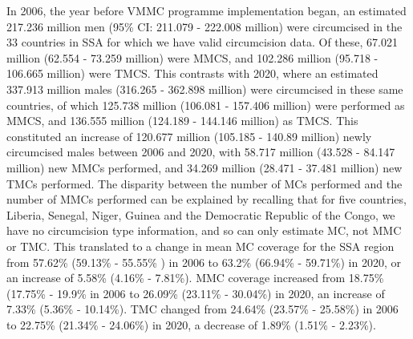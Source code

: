 \documentclass{article}
\begin{document}
In 2006, the year before VMMC programme implementation began, an estimated 217.236 million men (95\%
CI: 211.079 - 222.008 million) were circumcised in the 33 countries in SSA for which we have valid circumcision
data. 
Of these, 67.021 million (62.554 - 73.259 million) were MMCS, and 102.286 million (95.718 - 106.665
million) were TMCS. 
This contrasts with 2020, where an estimated 337.913 million males (316.265 - 362.898
million) were circumcised in these same countries, of which 125.738 million (106.081 - 157.406 million) were
performed as MMCS, and 136.555 million (124.189 - 144.146 million) as TMCS. 
This constituted an increase
of 120.677 million (105.185 - 140.89 million) newly circumcised males between 2006 and 2020, with 58.717
million (43.528 - 84.147 million) new MMCs performed, and 34.269 million (28.471 - 37.481 million) new
TMCs performed. 
The disparity between the number of MCs performed and the number of MMCs performed
can be explained by recalling that for five countries, Liberia, Senegal, Niger, Guinea and the Democratic
Republic of the Congo, we have no circumcision type information, and so can only estimate MC, not MMC or
TMC. 
This translated to a change in mean MC coverage for the SSA region from 57.62\% (59.13\% - 55.55\%
) in 2006 to 63.2\% (66.94\% - 59.71\%) in 2020, or an increase of 5.58\% (4.16\% - 7.81\%). 
MMC coverage increased from 18.75\% (17.75\% - 19.9\%  in 2006 to 26.09\% (23.11\% - 30.04\%) in 2020, an increase of 7.33\%
(5.36\% - 10.14\%). 
TMC changed from 24.64\% (23.57\% - 25.58\%) in 2006 to 22.75\% (21.34\% - 24.06\%) in 2020, a decrease of 1.89\% (1.51\% - 2.23\%).
\end{document}
